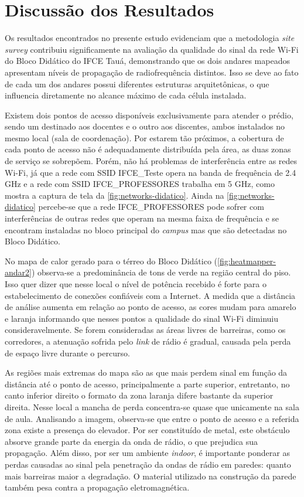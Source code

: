 \section{Discussão dos Resultados}
\label{discussao-dos-resultados}

Os resultados encontrados no presente estudo evidenciam que a metodologia \textit{site survey} contribuiu significamente na avaliação da qualidade do sinal da rede Wi-Fi do Bloco Didático do IFCE Tauá, demonstrando que os dois andares mapeados apresentam níveis de propagação de radiofrequência distintos. Isso se deve ao fato de cada um dos andares possui diferentes estruturas arquitetônicas, o que influencia diretamente no alcance máximo de cada célula instalada.
	
Existem dois pontos de acesso disponíveis exclusivamente para atender o prédio, sendo um destinado aos docentes e o outro aos discentes, ambos instalados no mesmo local (sala de coordenação). Por estarem tão próximos, a cobertura de cada ponto de acesso não é adequadamente distribuída pela área, as duas zonas de serviço se sobrepõem. Porém, não há problemas de interferência entre as redes Wi-Fi, já que a rede com SSID IFCE\_Teste opera na banda de frequência de 2.4 GHz e a rede com SSID IFCE\_PROFESSORES trabalha em 5 GHz, como mostra a captura de tela da \autoref{fig:networks-didatico}. Ainda na \autoref{fig:networks-didatico} percebe-se que a rede IFCE\_PROFESSORES pode sofrer com interferências de outras redes que operam na mesma faixa de frequência e se encontram instaladas no bloco principal do \textit{campus} mas que são detectadas no Bloco Didático.

No mapa de calor gerado para o térreo do Bloco Didático (\autoref{fig:heatmapper-andar2}) observa-se a predominância de tons de verde na região central do piso. Isso quer dizer que nesse local o nível de potência recebido é forte para o estabelecimento de conexões confiáveis com a Internet. A medida que a distância de análise aumenta em relação ao ponto de acesso, as cores mudam para amarelo e laranja informando que nesses pontos a qualidade do sinal Wi-Fi diminuiu consideravelmente. Se forem consideradas as áreas livres de barreiras, como os corredores, a atenuação sofrida pelo \textit{link} de rádio é gradual, causada pela perda de espaço livre durante o percurso. 

As regiões mais extremas do mapa são as que mais perdem sinal em função da distância até o ponto de acesso, principalmente a parte superior, entretanto, no canto inferior direito o formato da zona laranja difere bastante da superior direita. Nesse local a mancha de perda concentra-se quase que unicamente na sala de aula. Analisando a imagem, observa-se que entre o ponto de acesso e a referida zona existe a presença do elevador. Por ser constituído de metal, este obstáculo absorve grande parte da energia da onda de rádio, o que prejudica sua propagação. Além disso, por ser um ambiente \textit{indoor}, é importante ponderar as perdas causadas ao sinal pela penetração da ondas de rádio em paredes: quanto mais barreiras maior a degradação. O material utilizado na construção da parede também pesa contra a propagação eletromagnética.

